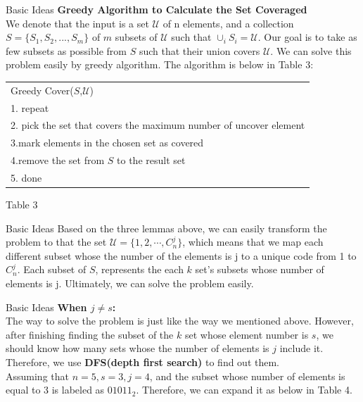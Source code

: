 \documentclass[hyperref={pdfpagelabels=false}]{beamer}
\begin{document}
\begin{frame}{Basic Ideas}
    \textbf{Greedy Algorithm to Calculate the Set Coveraged}\\
    We denote that the input is a set $\mathcal{U}$ of n elements, and a collection $S=\{S_1, S_2, . . . , S_m\}$ of $m$ subsets of $\mathcal{U}$ such that $\cup_{i} S_i=\mathcal{U}$. Our goal is to take as few subsets as possible from $S$ such that their union covers $\mathcal{U}$. We can solve this problem easily by greedy algorithm. The algorithm is below in Table 3:
    \begin{center}
    \begin{table}[!hpbt]
        \begin{tabular}{|l|}
        \hline
        Greedy Cover($S$,$\mathcal{U}$)\\
        1. repeat\\
        2. pick the set that covers the maximum number of uncover element \\
        3.mark elements in the chosen set as covered\\
        4.remove the set from $S$ to the result set\\
        5. done\\ 
        \hline
        \end{tabular}
    \end{table}
    Table 3
    \end{center}
\end{frame}

\begin{frame}{Basic Ideas}
    Based on the three lemmas above, we can easily transform the problem to that the set $\mathcal{U}=\{1,2,\cdots, C^j_n\}$, which means that we map each different subset whose the number of the elements is j to a unique code from 1 to $ C^j_n$. Each subset of $S$, represents the each $k$ set's subsets whose number of elements is j. Ultimately, we can solve the problem easily.
\end{frame}

\begin{frame}{Basic Ideas}
    \textbf{When $j \neq s$:}\\
    The way to solve the problem is just like the way we mentioned above. However, after finishing finding the subset of the $k$ set whose element number is $s$, we should know how many sets whose the number of elements is $j$ include it. Therefore, we use \textbf{DFS(depth first search)} to find out them.\\
    Assuming that $n=5, s=3, j=4$, and the subset whose number of elements is equal to 3 is labeled as $01011_2$. Therefore, we can expand it as below in Table 4.
\end{frame}
\end{document}
